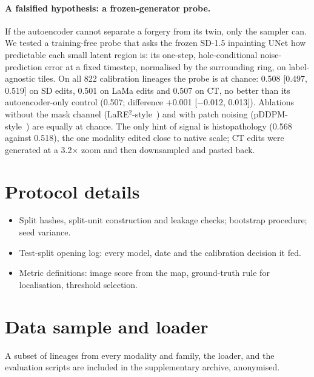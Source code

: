 \paragraph{A falsified hypothesis: a frozen-generator probe.}
If the autoencoder cannot separate a forgery from its twin, only the sampler can.
We tested a training-free probe that asks the frozen SD-1.5 inpainting UNet how predictable each small latent region is: its one-step, hole-conditional noise-prediction error at a fixed timestep, normalised by the surrounding ring, on label-agnostic tiles.
On all 822 calibration lineages the probe is at chance: 0.508 [0.497, 0.519] on SD edits, %
0.501 on LaMa edits %
and 0.507 on CT, %
no better than its autoencoder-only control (0.507; difference $+$0.001 [$-$0.012, 0.013]). %
Ablations without the mask channel (LaRE$^2$-style~\cite{luo2024lare2}) and with patch noising (pDDPM-style~\cite{behrendt2024pddpm}) are equally at chance. %
The only hint of signal is histopathology (0.568 against 0.518), %
the one modality edited close to native scale; %
CT edits were generated at a 3.2$\times$ zoom and then downsampled and pasted back. %

\section{Protocol details}
\begin{itemize}[leftmargin=*,itemsep=1pt]
\item Split hashes, split-unit construction and leakage checks; bootstrap procedure; seed variance.
\item Test-split opening log: every model, date and the calibration decision it fed.
\item Metric definitions: image score from the map, ground-truth rule for localisation, threshold selection.
\end{itemize}

\section{Data sample and loader}
A subset of lineages from every modality and family, the loader, and the evaluation scripts are included in the supplementary archive, anonymised. 
